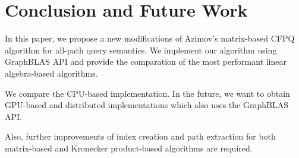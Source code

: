 \section{Conclusion and Future Work}
In this paper, we propose a new modifications of Azimov's matrix-based CFPQ algorithm for all-path query semantics. We implement our algorithm using GraphBLAS API and provide the comparation of the most performant linear algebra-based algorithms.

We compare the CPU-based implementation. In the future, we want to obtain GPU-based and distributed implementations which also uses the GraphBLAS API.

Also, further improvements of index creation and path extraction for both matrix-based and Kronecker product-based algorithms are required.